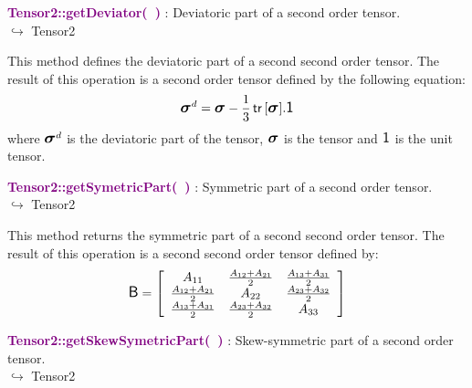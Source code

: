 \textcolor{purple}{\textbf{Tensor2::getDeviator(~)}}\label{Tensor2::getDeviator()} : Deviatoric part of a second order tensor.\\ \hspace*{5mm}$\hookrightarrow$ Tensor2

This method defines the deviatoric part of a second second order tensor.
The result of this operation is a second order tensor defined by the following equation:
\begin{equation*}
\mbox{\large\ensuremath{\boldsymbol{\sigma}}}^d=\mbox{\large\ensuremath{\boldsymbol{\sigma}}}-\frac{1}{3}\mbox{\ensuremath{\mathsf{\,tr\,}}}[\mbox{\large\ensuremath{\boldsymbol{\sigma}}}].\mbox{\large\ensuremath{\mathsf{1}}}
\end{equation*}
where $\mbox{\large\ensuremath{\boldsymbol{\sigma}}}^d$ is the deviatoric part of the tensor, $\mbox{\large\ensuremath{\boldsymbol{\sigma}}}$ is the tensor and $\mbox{\large\ensuremath{\mathsf{1}}}$ is the unit tensor.

\textcolor{purple}{\textbf{Tensor2::getSymetricPart(~)}}\label{Tensor2::getSymetricPart()} : Symmetric part of a second order tensor.\\ \hspace*{5mm}$\hookrightarrow$ Tensor2

This method returns the symmetric part of a second second order tensor.
The result of this operation is a second second order tensor defined by:
\begin{equation*}
\mbox{\large\ensuremath{\mathsf{B}}} = \left[\begin{array}{ccc}
 A_{11} & \frac{A_{12} + A_{21}}{2} & \frac{A_{13} + A_{31}}{2}\\
 \frac{A_{12} + A_{21}}{2} & A_{22} & \frac {A_{23} + A_{32}}{2}\\
 \frac{A_{13} + A_{31}}{2} & \frac {A_{23} + A_{32}}{2} & A_{33}\end{array}
\right]
\end{equation*}

\textcolor{purple}{\textbf{Tensor2::getSkewSymetricPart(~)}}\label{Tensor2::getSkewSymetricPart()} : Skew-symmetric part of a second order tensor.\\ \hspace*{5mm}$\hookrightarrow$ Tensor2

